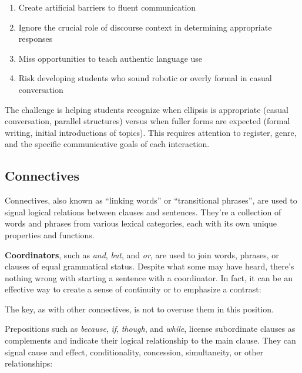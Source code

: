 \begin{tcolorbox}[title=``Use complete sentences'', colback=white, colframe=blue!75!black, fonttitle=\bfseries]
\begin{enumerate}[noitemsep]
   \item Create artificial barriers to fluent communication
   \item Ignore the crucial role of discourse context in determining appropriate responses
   \item Miss opportunities to teach authentic language use
   \item Risk developing students who sound robotic or overly formal in casual conversation
\end{enumerate}

The challenge is helping students recognize when ellipsis is appropriate (casual conversation, parallel structures) versus when fuller forms are expected (formal writing, initial introductions of topics). This requires attention to register, genre, and the specific communicative goals of each interaction.
\end{tcolorbox}


\subsection{Connectives}

Connectives, also known as ``linking words'' or ``transitional phrases'', are used to signal logical relations between clauses and sentences. They're a collection of words and phrases from various lexical categories, each with its own unique properties and functions.

\textbf{Coordinators}, such as \textit{and}, \textit{but}, and \textit{or}, are used to join words, phrases, or clauses of equal grammatical status. Despite what some may have heard, there's nothing wrong with starting a sentence with a coordinator. In fact, it can be an effective way to create a sense of continuity or to emphasize a contrast:

\z
The key, as with other connectives, is not to overuse them in this position.

Prepositions such as \textit{because}, \textit{if}, \textit{though}, and \textit{while}, license subordinate clauses as complements and indicate their logical relationship to the main clause. They can signal cause and effect, conditionality, concession, simultaneity, or other relationships:

